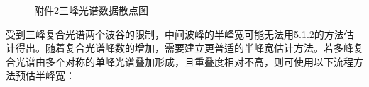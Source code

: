 \documentclass{article}
\numberwithin{equation}{subsection}
\begin{document}
\begin{figure}[htbp]
    \centering
        \caption{附件2三峰光谱数据散点图}
\end{figure}
受到三峰复合光谱两个波谷的限制，中间波峰的半峰宽可能无法用5.1.2的方法估计得出。随着复合光谱峰数的增加，需要建立更普适的半峰宽估计方法。若多峰复合光谱由多个对称的单峰光谱叠加形成，且重叠度相对不高，则可使用以下流程方法预估半峰宽：
\end{document}
